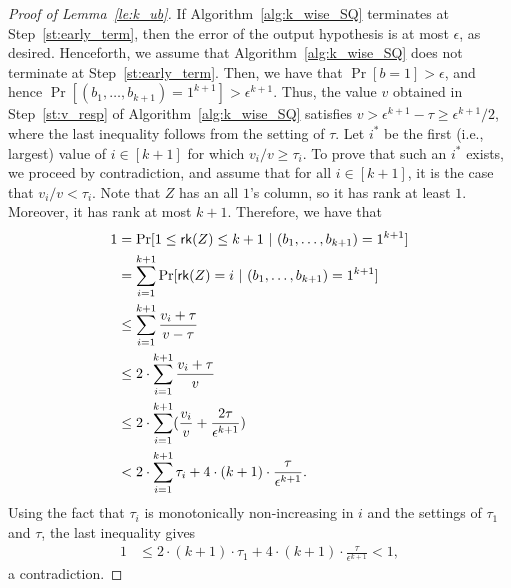 \begin{proof}[Proof of Lemma~\ref{le:k_ub}]
If Algorithm~\ref{alg:k_wise_SQ} terminates at Step~\ref{st:early_term}, then the error of the output hypothesis is at most $\epsilon$, as desired. Henceforth, we assume that Algorithm~\ref{alg:k_wise_SQ} does not terminate at Step~\ref{st:early_term}. Then, we have that $\Pr[b = 1] > \epsilon$, and hence $\Pr[(b_1,\dots,b_{k+1}) = 1^{k+1}] > \epsilon^{k+1}$. Thus, the value $v$ obtained in Step~\ref{st:v_resp} of Algorithm~\ref{alg:k_wise_SQ} satisfies $v > \epsilon^{k+1} - \tau \geq \epsilon^{k+1}/2$, where the last inequality follows from the setting of $\tau$. Let $i^*$ be the first (i.e., largest) value of $i \in  [k+1]$ for which $v_i/v \geq \tau_i$. To prove that such an $i^*$ exists, we proceed by contradiction, and assume that for all $i \in [k+1]$, it is the case that $v_i/v < \tau_i$. Note that $Z$ has an all $1$'s column, so it has rank at least $1$. Moreover, it has rank at most $k+1$. Therefore, we have that
\begin{align*}
1 &= \Pr[1 \le \mathsf{rk}(Z) \le k+1 ~ |~ (b_1,\dots,b_{k+1})=1^{k+1}]\\
&= \displaystyle\sum\limits_{i=1}^{k+1} \Pr[\mathsf{rk}(Z) = i ~ | ~ (b_1,\dots,b_{k+1})=1^{k+1}]\\
&\le \displaystyle\sum\limits_{i=1}^{k+1} \frac{v_i + \tau}{v - \tau}\\
&\le 2 \cdot \displaystyle\sum\limits_{i=1}^{k+1} \frac{v_i + \tau}{v}\\
&\le 2 \cdot \displaystyle\sum\limits_{i=1}^{k+1} (\frac{v_i}{v}  + \frac{2\tau}{\epsilon^{k+1}})\\
&< 2 \cdot \displaystyle\sum\limits_{i=1}^{k+1} \tau_i + 4 \cdot (k+1) \cdot \frac{\tau}{\epsilon^{k+1}}.
\end{align*}
Using the fact that $\tau_i$ is monotonically non-increasing in $i$ and the settings of $\tau_1$ and $\tau$, the last inequality gives
\begin{align*}
1 &\le 2 \cdot (k+1) \cdot \tau_1 + 4 \cdot (k+1) \cdot \frac{\tau}{\epsilon^{k+1}} < 1,
\end{align*}
a contradiction.


\end{proof}
